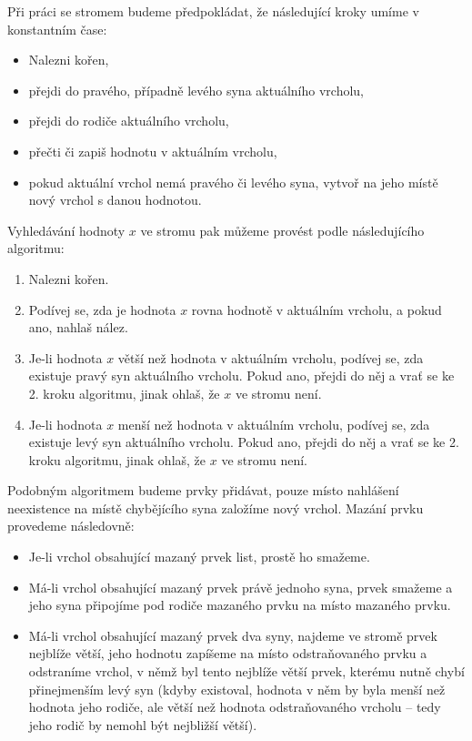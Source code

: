 Při práci se stromem budeme předpokládat, že následující kroky umíme v konstantním čase:
\begin{itemize}
\item Nalezni kořen,
\item přejdi do pravého, případně levého syna aktuálního vrcholu,
\item přejdi do rodiče aktuálního vrcholu,
\item přečti či zapiš hodnotu v aktuálním vrcholu,
\item pokud aktuální vrchol nemá pravého či levého syna, vytvoř na jeho místě nový vrchol s danou hodnotou.
\end{itemize}
Vyhledávání hodnoty $x$ ve stromu pak můžeme provést podle následujícího algoritmu:
\begin{enumerate}
\item Nalezni kořen.
\item Podívej se, zda je hodnota $x$ rovna hodnotě v aktuálním vrcholu, a pokud ano, nahlaš nález.
\item Je-li hodnota $x$ větší než hodnota v aktuálním vrcholu, podívej se, zda existuje pravý syn aktuálního vrcholu. Pokud ano, přejdi do něj a vrať se ke 2. kroku algoritmu, jinak ohlaš, že  $x$ ve stromu není.
\item Je-li hodnota $x$ menší než hodnota v aktuálním vrcholu, podívej se, zda existuje levý syn aktuálního vrcholu. Pokud ano, přejdi do něj a vrať se ke 2. kroku algoritmu, jinak ohlaš, že  $x$ ve stromu není.
\end{enumerate}

Podobným algoritmem budeme prvky přidávat, pouze místo nahlášení neexistence na místě chybějícího syna založíme nový vrchol. Mazání prvku provedeme následovně:

\begin{itemize}
\item Je-li vrchol obsahující mazaný prvek list, prostě ho smažeme.
\item Má-li vrchol obsahující mazaný prvek právě jednoho syna, prvek smažeme a jeho syna připojíme pod rodiče mazaného prvku na místo mazaného prvku.
\item Má-li vrchol obsahující mazaný prvek dva syny, najdeme ve stromě prvek nejblíže větší, jeho
hodnotu zapíšeme na místo odstraňovaného prvku a odstraníme vrchol, v němž byl tento nejblíže větší
prvek, kterému nutně chybí přinejmenším levý syn (kdyby existoval, hodnota v
něm by byla menší než hodnota jeho rodiče, ale větší než hodnota odstraňovaného
vrcholu -- tedy jeho rodič by nemohl být nejbližší větší).  
\end{itemize} 

